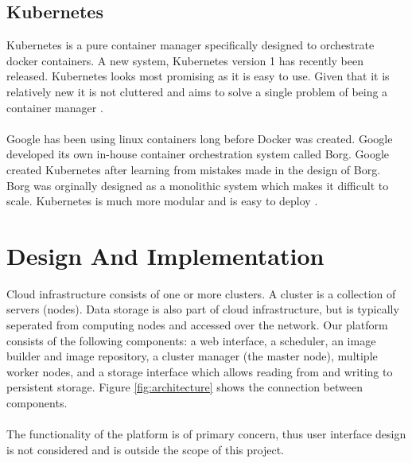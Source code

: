 \documentclass{sig-alternate-05-2015}
\begin{document}
\subsection{Kubernetes}
Kubernetes is a pure container manager specifically designed to orchestrate docker containers. A new system, Kubernetes version 1 has recently been released. Kubernetes looks most promising as it is easy to use. Given that it is relatively new it is not cluttered and aims to solve a single problem of being a container manager \cite{googleborg}. 
\\\\
Google has been using linux containers long before Docker was created. Google developed its own in-house container orchestration system called Borg. Google created Kubernetes after learning from mistakes made in the design of Borg. Borg was orginally designed as a monolithic system which makes it difficult to scale. Kubernetes is much more modular and is easy to deploy \cite{googleborg}.


\section{Design And Implementation}


Cloud infrastructure consists of one or more clusters. A cluster is a collection of servers (nodes). Data storage is also part of cloud infrastructure, but is typically seperated from computing nodes and accessed over the network. Our platform consists of the following components: a web interface, a scheduler, an image builder and image repository, a cluster manager (the master node), multiple worker nodes, and a storage interface which allows reading from and writing to persistent storage. Figure \ref{fig:architecture} shows the connection between components.
\\\\
The functionality of the platform is of primary concern, thus user interface design is not considered and is outside the scope of this project. 
\end{document}
